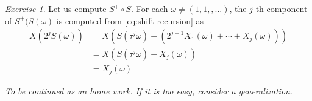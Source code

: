 \documentclass[12pt,a4paper]{amsart}
\theoremstyle{plain}
\theoremstyle{definition}
\theoremstyle{remark}
\newtheorem{exercise}[theorem]{Exercise}
\begin{document}
\begin{exercise}
Let us compute $S^+ \circ S$. For each $\omega \neq (1,1,,\dots)$,
the $j$-th component of $S^+(S(\omega)$ is computed from
\cref{eq:shift-recursion} as
\begin{align*}
  X(2^jS(\omega)) &= X\left(S(\tau^j \omega ) + (2^{j-1}X_1(\omega)  +
                    \cdots + X_j(\omega))\right) \\
                  &= X\left(S(\tau^j \omega ) + X_j(\omega)\right) \\
  &= X_j(\omega)
\end{align*}

\emph{To be continued as an home work. If it is too easy, consider a generalization}.
\end{exercise}



\end{document}
